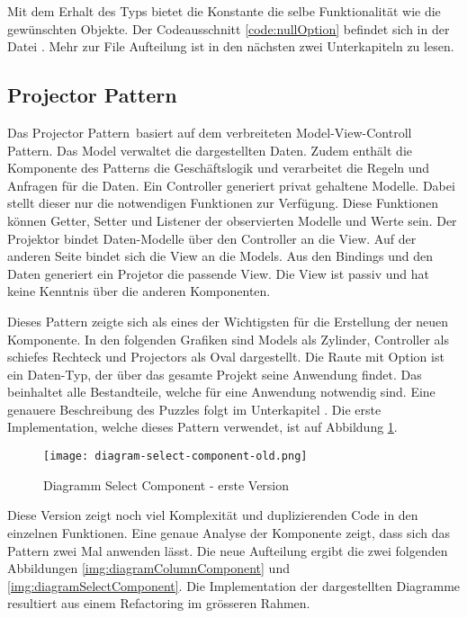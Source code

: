 Mit dem Erhalt des Typs  bietet die Konstante die selbe Funktionalität wie die gewünschten Objekte. 
Der Codeausschnitt \ref{code:nullOption} befindet sich in der Datei .
Mehr zur File Aufteilung ist in den nächsten zwei Unterkapiteln zu lesen.

\subsection{Projector Pattern}
\label{sec:projectorPattern}

Das Projector Pattern\footnotemark \ basiert auf dem verbreiteten Model-View-Controll Pattern.
Das Model verwaltet die dargestellten Daten.
Zudem enthält die Komponente des Patterns die Geschäftslogik und verarbeitet die Regeln und Anfragen für die Daten.
Ein Controller generiert privat gehaltene Modelle.
Dabei stellt dieser nur die notwendigen Funktionen zur Verfügung.
Diese Funktionen können Getter, Setter und Listener der observierten Modelle und Werte sein.
Der Projektor bindet Daten-Modelle über den Controller an die View.
Auf der anderen Seite bindet sich die View an die Models.
Aus den Bindings und den Daten generiert ein Projetor die passende View.
Die View ist passiv und hat keine Kenntnis über die anderen Komponenten.

Dieses Pattern zeigte sich als eines der Wichtigsten für die Erstellung der neuen Komponente.
In den folgenden Grafiken sind Models als Zylinder, Controller als schiefes Rechteck und Projectors als Oval dargestellt.
Die Raute mit Option ist ein Daten-Typ, der über das gesamte Projekt seine Anwendung findet.
Das  beinhaltet alle Bestandteile, welche für eine Anwendung notwendig sind.
Eine genauere Beschreibung des Puzzles folgt im Unterkapitel \textbf{}.
Die erste Implementation, welche dieses Pattern verwendet, ist auf Abbildung \ref{img:diagramSelectComponentOld}.

\begin{figure}[!htb]
    \centering
    \texttt{[image: diagram-select-component-old.png]}
    \caption{Diagramm Select Component - erste Version}
    \label{img:diagramSelectComponentOld}
\end{figure}

Diese Version zeigt noch viel Komplexität und duplizierenden Code in den einzelnen Funktionen.
Eine genaue Analyse der Komponente zeigt, dass sich das Pattern zwei Mal anwenden lässt.
Die neue Aufteilung ergibt die zwei folgenden Abbildungen \ref{img:diagramColumnComponent} und \ref{img:diagramSelectComponent}.
Die Implementation der dargestellten Diagramme resultiert aus einem Refactoring im grösseren Rahmen.

